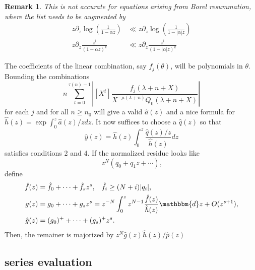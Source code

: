 \documentclass[12pt]{article}
\newcommand{\dd}[0] {\mathbbm{d}}
\numberwithin{equation}{section}
\newtheorem{remark}[theorem]{Remark}
\begin{document}
\begin{remark}
This is not accurate for equations arising from Borel resummation, where the list needs to be augmented by
\begin{align*}
z \partial_z \log\left(\frac{1}{1-\alpha z}\right) &\ll z \partial_z \log\left(\frac{1}{1-|\alpha| z}\right)\\
z \partial_z \frac{z^i}{(1-\alpha z)^k} &\ll z \partial_z\frac{z^i}{(1-|\alpha| z)^k}
\end{align*}
\end{remark}

The coefficients of the linear combination, say $f_j(\theta)$, will be polynomials in $\theta$. Bounding the combinations
\begin{equation*}
n \sum_{t=0}^{\tau(n) - 1} \left| [X^t] \frac{f_j(\lambda+n+X)}{X^{-\mu(\lambda+n)} Q_0(\lambda+n+X)} \right|
\end{equation*}
for each $j$ and for all $n \ge n_0$ will give a valid $\hat{a}(z)$ and a nice formula for $\hat{h}(z) = \exp \int_0^z \hat{a}(z)/z dz$. It now suffices to choose a $\hat{q}(z)$ so that
\begin{equation*}
\hat{y}(z)=\hat{h}(z) \int_0^z \frac{\hat{q}(z)/z}{\hat{h}(z)}{dz}
\end{equation*}
satisfies conditions 2 and 4. If the normalized residue looks like
\begin{equation*}
z^N (q_0 + q_1 z + \cdots)\text{,}
\end{equation*}
define
\begin{align*}
\hat{f}(z) &= \hat{f}_0 + \cdots + \hat{f}_s z^s\text{,} \quad \hat{f}_i \ge (N+i)|q_i|\text{,}\\
g(z) &= g_0 + \cdots + g_s z^s = z^{-N} \int_0^z z^{N-1} \frac{\hat{f}(z)}{\hat{h}(z)} \dd z + O(z^{s+1})\text{,}\\
\hat{g}(z) &= (g_0)^+ + \cdots + (g_s)^+ z^s\text{.}
\end{align*}
Then, the remainer is majorized by $z^N \hat{g}(z) \hat{h}(z)/ \hat{p}(z)$


\subsection{series evaluation}
\end{document}
